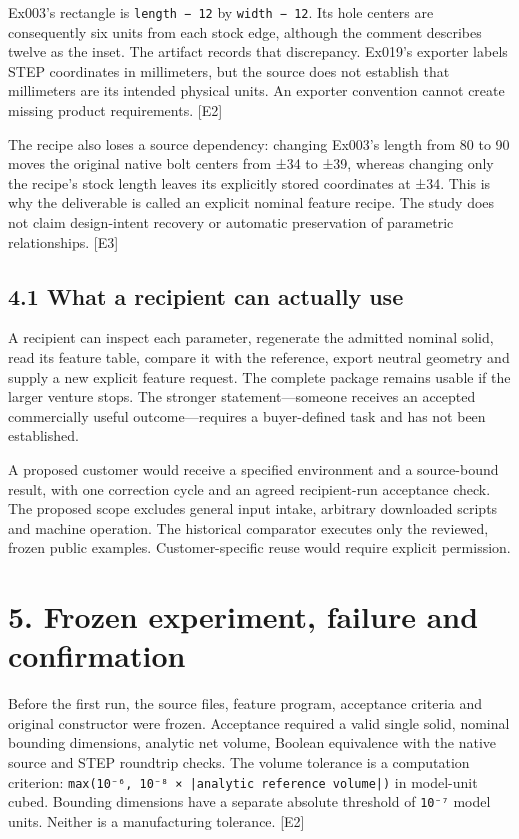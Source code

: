 \documentclass[11pt,letterpaper]{article}
\begin{document}
Ex003's rectangle is \nolinkurl{length − 12} by \nolinkurl{width − 12}. Its hole centers are consequently six units from each stock edge, although the comment describes twelve as the inset. The artifact records that discrepancy. Ex019's exporter labels STEP coordinates in millimeters, but the source does not establish that millimeters are its intended physical units. An exporter convention cannot create missing product requirements. {[}E2{]}

The recipe also loses a source dependency: changing Ex003's length from 80 to 90 moves the original native bolt centers from ±34 to ±39, whereas changing only the recipe's stock length leaves its explicitly stored coordinates at ±34. This is why the deliverable is called an explicit nominal feature recipe. The study does not claim design-intent recovery or automatic preservation of parametric relationships. {[}E3{]}

\hypertarget{what-a-recipient-can-actually-use}{%
\subsection{4.1 What a recipient can actually use}\label{what-a-recipient-can-actually-use}}

A recipient can inspect each parameter, regenerate the admitted nominal solid, read its feature table, compare it with the reference, export neutral geometry and supply a new explicit feature request. The complete package remains usable if the larger venture stops. The stronger statement---someone receives an accepted commercially useful outcome---requires a buyer-defined task and has not been established.

A proposed customer would receive a specified environment and a source-bound result, with one correction cycle and an agreed recipient-run acceptance check. The proposed scope excludes general input intake, arbitrary downloaded scripts and machine operation. The historical comparator executes only the reviewed, frozen public examples. Customer-specific reuse would require explicit permission.

\hypertarget{frozen-experiment-failure-and-confirmation}{%
\section{5. Frozen experiment, failure and confirmation}\label{frozen-experiment-failure-and-confirmation}}

Before the first run, the source files, feature program, acceptance criteria and original constructor were frozen. Acceptance required a valid single solid, nominal bounding dimensions, analytic net volume, Boolean equivalence with the native source and STEP roundtrip checks. The volume tolerance is a computation criterion: \nolinkurl{max(10⁻⁶, 10⁻⁸ × |analytic reference volume|)} in model-unit cubed. Bounding dimensions have a separate absolute threshold of \nolinkurl{10⁻⁷} model units. Neither is a manufacturing tolerance. {[}E2{]}
\end{document}
